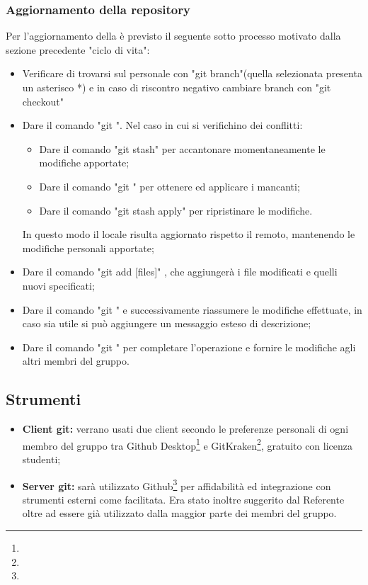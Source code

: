 \documentclass[NormeDiProgetto.tex]{subfiles}
\begin{document}
	\subsubsection{Aggiornamento della repository}
	Per l'aggiornamento della  è previsto il seguente sotto processo motivato dalla sezione precedente "ciclo di vita":
	\begin{itemize}
		\item Verificare di trovarsi sul  personale con "git branch"(quella selezionata presenta un asterisco *) e in caso di riscontro negativo cambiare branch con "git checkout"
		\item Dare il comando "git ". Nel caso in cui si verifichino dei conflitti:
		\begin{itemize}
			\item Dare il comando "git stash" per accantonare momentaneamente	le modifiche apportate;
			\item Dare il comando "git " per ottenere ed applicare i  mancanti;
			\item Dare il comando "git stash apply" per ripristinare le modifiche.
		\end{itemize}
		In questo modo il  locale risulta aggiornato rispetto il  remoto, mantenendo le modifiche personali apportate;
	
		\item Dare il comando "git add [files]" , che aggiungerà i file modificati e quelli nuovi specificati;
		\item Dare il comando "git " e successivamente riassumere le modifiche effettuate, in caso sia utile si può aggiungere un messaggio esteso di descrizione;
		\item Dare il comando "git " per completare l'operazione e fornire le modifiche agli altri membri del gruppo.
	\end{itemize}
	\subsection{Strumenti}
	\begin{itemize}
		\item \textbf{Client git:} verrano usati due client secondo le preferenze personali di ogni membro del gruppo tra Github Desktop\footnote{} e GitKraken\footnote{}, gratuito con licenza studenti;
		\item \textbf{Server git:} sarà utilizzato Github\footnote{} per affidabilità ed integrazione con strumenti esterni come  facilitata. Era stato inoltre suggerito dal Referente oltre ad essere già utilizzato dalla maggior parte dei membri del gruppo.
	\end{itemize}
\end{document}

